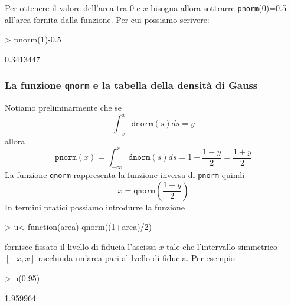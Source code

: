 \documentclass[onecolumn,11pt]{book}
\begin{document}
Per ottenere il valore dell'area tra 0 e $x$ bisogna allora sottrarre \texttt{pnorm}(0)=0.5 all'area fornita dalla funzione.
Per cui possiamo scrivere:
\begin{Schunk}
\begin{Sinput}
> pnorm(1)-0.5
\end{Sinput}
\begin{Soutput}
[1] 0.3413447
\end{Soutput}
\end{Schunk}


 \subsubsection{La funzione \texttt{qnorm} e la tabella della densit\`a di Gauss}

Notiamo preliminarmente che 
se $$ \int_{-x}^x \texttt{dnorm}(s)ds= y$$ allora
$$\texttt{pnorm}(x)=\int_{-\infty}^x \texttt{dnorm}(s)ds=1-\frac{1-y}{2}=\frac{1+y}{2}$$
 La funzione \texttt{qnorm} rappresenta la funzione inversa di \texttt{pnorm}  quindi
$$x=\texttt{qnorm}\left(\frac{1+y}{2}\right)$$
In termini pratici possiamo introdurre la funzione
\begin{Schunk}
\begin{Sinput}
> u<-function(area) qnorm((1+area)/2)
\end{Sinput}
\end{Schunk}
fornisce fissato il livello di fiducia l'ascissa $x$  tale che l'intervallo simmetrico $[-x,x]$ racchiuda un'area pari al lvello di fiducia. Per esempio
\begin{Schunk}
\begin{Sinput}
> u(0.95)
\end{Sinput}
\begin{Soutput}
[1] 1.959964
\end{Soutput}
\end{Schunk}
\end{document}
